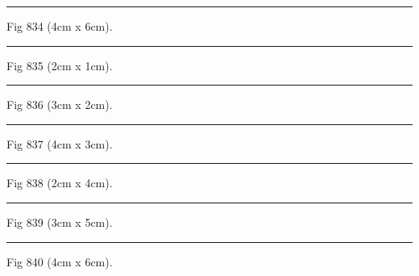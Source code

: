 \documentclass[a4paper,11pt]{article}
\begin{document}
\begin{swarmwrap}%
  \begin{minipage}[t]{4cm}
    \centering
    \rule{\linewidth}{6cm}
    {\footnotesize Fig 834 (4cm x 6cm).}
  \end{minipage}%
\end{swarmwrap}%
\swarmwrapnext
\lipsum[84]%

\begin{swarmwrap}%
  \begin{minipage}[t]{2cm}
    \centering
    \rule{\linewidth}{1cm}
    {\footnotesize Fig 835 (2cm x 1cm).}
  \end{minipage}%
\end{swarmwrap}%
\swarmwrapnext
\lipsum[85]%

\begin{swarmwrap}%
  \begin{minipage}[t]{3cm}
    \centering
    \rule{\linewidth}{2cm}
    {\footnotesize Fig 836 (3cm x 2cm).}
  \end{minipage}%
\end{swarmwrap}%
\swarmwrapnext
\lipsum[86]%

\begin{swarmwrap}%
  \begin{minipage}[t]{4cm}
    \centering
    \rule{\linewidth}{3cm}
    {\footnotesize Fig 837 (4cm x 3cm).}
  \end{minipage}%
\end{swarmwrap}%
\swarmwrapnext
\lipsum[87]%

\begin{swarmwrap}%
  \begin{minipage}[t]{2cm}
    \centering
    \rule{\linewidth}{4cm}
    {\footnotesize Fig 838 (2cm x 4cm).}
  \end{minipage}%
\end{swarmwrap}%
\swarmwrapnext
\lipsum[88]%

\begin{swarmwrap}%
  \begin{minipage}[t]{3cm}
    \centering
    \rule{\linewidth}{5cm}
    {\footnotesize Fig 839 (3cm x 5cm).}
  \end{minipage}%
\end{swarmwrap}%
\swarmwrapnext
\lipsum[89]%

\begin{swarmwrap}%
  \begin{minipage}[t]{4cm}
    \centering
    \rule{\linewidth}{6cm}
    {\footnotesize Fig 840 (4cm x 6cm).}
  \end{minipage}%
\end{swarmwrap}%
\swarmwrapnext
\lipsum[90]%
\end{document}
